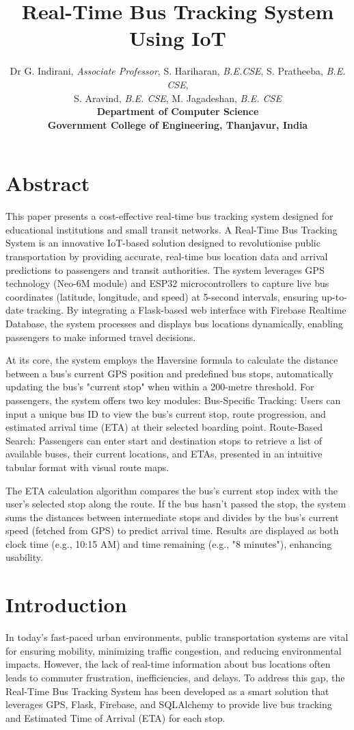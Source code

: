 \documentclass{article}
\title{\vspace{-2cm}\centering\Large\textbf{Real-Time Bus Tracking System Using IoT}}
\author{
Dr G. Indirani, \textit{Associate Professor}, S. Hariharan, \textit{B.E.CSE}, S. Pratheeba, \textit{B.E. CSE},\\
S. Aravind, \textit{B.E. CSE}, M. Jagadeshan, \textit{B.E. CSE}\\
\textbf{Department of Computer Science}\\
\textbf{Government College of Engineering, Thanjavur, India}
}
\date{}
\begin{document}
\maketitle

\begin{multicols}{2}

\section*{Abstract}
This paper presents a cost-effective real-time bus tracking system designed for educational institutions and small transit networks. A Real-Time Bus Tracking System is an innovative IoT-based solution designed to revolutionise public transportation by providing accurate, real-time bus location data and arrival predictions to passengers and transit authorities. The system leverages GPS technology (Neo-6M module) and ESP32 microcontrollers to capture live bus coordinates (latitude, longitude, and speed) at 5-second intervals, ensuring up-to-date tracking. By integrating a Flask-based web interface with Firebase Realtime Database, the system processes and displays bus locations dynamically, enabling passengers to make informed travel decisions.

\vspace{1em}
At its core, the system employs the Haversine formula to calculate the distance between a bus's current GPS position and predefined bus stops, automatically updating the bus's "current stop" when within a 200-metre threshold. For passengers, the system offers two key modules: Bus-Specific Tracking: Users can input a unique bus ID to view the bus's current stop, route progression, and estimated arrival time (ETA) at their selected boarding point. Route-Based Search: Passengers can enter start and destination stops to retrieve a list of available buses, their current locations, and ETAs, presented in an intuitive tabular format with visual route maps.

\vspace{1em}
The ETA calculation algorithm compares the bus's current stop index with the user's selected stop along the route. If the bus hasn't passed the stop, the system sums the distances between intermediate stops and divides by the bus's current speed (fetched from GPS) to predict arrival time. Results are displayed as both clock time (e.g., 10:15 AM) and time remaining (e.g., "8 minutes"), enhancing usability.

\section{Introduction}
\vspace{0.5em}
In today's fast-paced urban environments, public transportation systems are vital for ensuring mobility, minimizing traffic congestion, and reducing environmental impacts. However, the lack of real-time information about bus locations often leads to commuter frustration, inefficiencies, and delays. To address this gap, the Real-Time Bus Tracking System has been developed as a smart solution that leverages GPS, Flask, Firebase, and SQLAlchemy to provide live bus tracking and Estimated Time of Arrival (ETA) for each stop.


\end{multicols}
\end{document}

